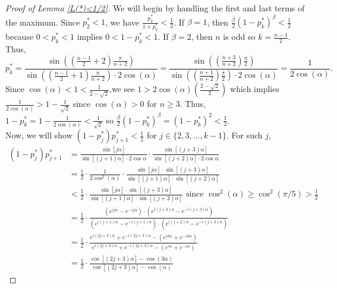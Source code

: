 \documentclass[11pt]{article}
\theoremstyle{definition}
\begin{document}
\begin{proof}[Proof of Lemma \ref{L(*)<1/2}]
    We will begin by handling the first and last terms of the maximum. Since $p_2^* < 1$, we have $\frac{p_2^*}{1+p_2^*} < \frac{1}{2}$. If $\beta = 1$, then $\frac{\beta}{2}(1-p_k^*)^\beta < \frac{1}{2}$ because $0 < p_k^* < 1$ implies $0 < 1-p_k^* < 1$. If $\beta = 2$, then $n$ is odd so $k = \frac{n-1}{2}$. Thus,
    $$p_k^* = \frac{\sin\left( \left( \frac{n-1}{2}+2 \right) \frac{\pi}{n+2}\right)}{\sin\left( \left( \frac{n-1}{2}+1 \right) \frac{\pi}{n+2}\right) \cdot 2 \cos\left( \alpha \right)} = \frac{\sin\left( \left( \frac{n+3}{n+2} \right) \frac{\pi}{2}\right)}{\sin\left( \left( \frac{n+1}{n+2} \right) \frac{\pi}{2}\right) \cdot 2 \cos\left( \alpha \right)} = \frac{1}{2\cos\left( \alpha \right)}.$$
    Since $\cos(\alpha) < 1 < \frac{1}{2-\sqrt{2}}$,we see $1 > 2\cos(\alpha)\left( \frac{2-\sqrt{2}}{2} \right)$ which implies $\frac{1}{2\cos(\alpha)} > 1-\frac{1}{\sqrt{2}}$ since $\cos(\alpha) > 0$ for $n \geq 3$. Thus, $1-p_k^* = 1-\frac{1}{2\cos(\alpha)} < \frac{1}{\sqrt{2}}$ so $\frac{\beta}{2}(1-p_k^*)^\beta = (1-p_k^*)^2 < \frac{1}{2}$.
    \\[5mm] Now, we will show $(1-p_j^*)p_{j+1}^* < \frac{1}{2}$ for $j \in \{ 2,3,\dots, k-1 \}$. For such $j$,
    \begin{align*}
        (1-p_j^*)p_{j+1}^* &= \frac{\sin[j \alpha]}{\sin[(j+1)\alpha] \cdot 2\cos\alpha} \cdot \frac{\sin[(j+3) \alpha]}{\sin[(j+2)\alpha] \cdot 2\cos\alpha} \\
        &= \frac{1}{2} \cdot \frac{1}{2\cos^2(\alpha)} \cdot \frac{\sin[j \alpha] \cdot \sin[(j+3) \alpha]}{\sin[(j+1)\alpha] \cdot \sin[(j+2)\alpha]} \\
        &< \frac{1}{2} \cdot \frac{\sin[j \alpha] \cdot \sin[(j+3) \alpha]}{\sin[(j+1)\alpha] \cdot \sin[(j+2)\alpha]} \text{ since } \cos^2(\alpha) \geq \cos^2(\pi/5) > \frac{1}{2} \\
        &= \frac{1}{2} \cdot \frac{\left( e^{ij\alpha} - e^{-ij\alpha} \right) \cdot \left( e^{i(j+3)\alpha} - e^{-i(j+3)\alpha} \right)}{\left( e^{i(j+1)\alpha} - e^{-i(j+1)\alpha} \right) \cdot \left( e^{i(j+2)\alpha} - e^{-i(j+2)\alpha} \right)} \\
        &= \frac{1}{2} \cdot \frac{e^{i(2j+3)\alpha} + e^{-i(2j+3)\alpha} - \left( e^{i3\alpha} + e^{-i3\alpha} \right)}{e^{i(2j+3)\alpha} + e^{-i(2j+3)\alpha} - \left( e^{i\alpha} + e^{-i\alpha} \right)} \\
        &= \frac{1}{2} \cdot \frac{\cos[(2j+3)\alpha] - \cos(3\alpha)}{\cos[(2j+3)\alpha] - \cos(\alpha)}

\end{align*}
\end{proof}
\end{document}
